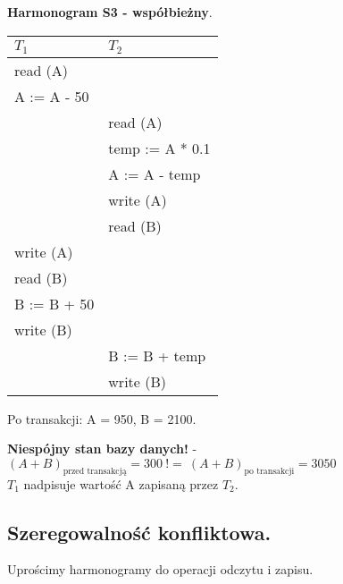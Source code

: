 \documentclass[main.tex]{subfiles}
\begin{document}
    \noindent \textbf{Harmonogram S3 - współbieżny}.
    \begin{table}[H]
        \begin{center}
            \begin{tabular}{| p{6cm} | p{6cm} |}
                \hline
                $T_1$ & $T_2$\\
                \hline
                \hline
                read (A) &\\
                \hline
                A := A - 50 &\\
                \hline
                & read (A)\\
                \hline
                & temp := A * 0.1\\
                \hline
                & A := A - temp\\
                \hline
                & write (A)\\
                \hline
                & read (B)\\
                \hline
                write (A) &\\
                \hline
                read (B) &\\
                \hline
                B := B + 50 &\\
                \hline
                write (B) &\\
                \hline
                & B := B + temp\\
                \hline
                & write (B)\\
                \hline
            \end{tabular}
        \end{center}
    \end{table}

    Po transakcji: A = 950, B = 2100.

    \textbf{Niespójny stan bazy danych!} - $( A + B )_{\text{przed transakcją}} = 300 ~ != ~ ( A + B )_{\text{po transakcji}} = 3050$\\
    $T_1$ nadpisuje wartość A zapisaną przez $T_2$.

    \subsection{Szeregowalność konfliktowa.}
    Uprościmy harmonogramy do operacji odczytu i zapisu.\\
\end{document}
